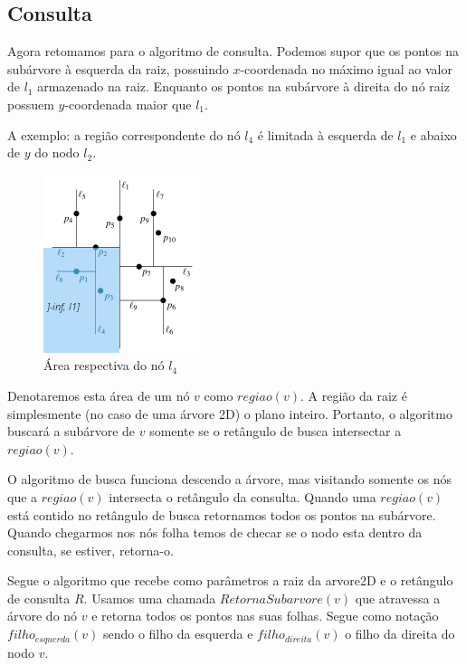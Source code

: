 \subsection{Consulta}

Agora retomamos para o algoritmo de consulta. Podemos supor que os pontos na subárvore à esquerda
da raiz, possuindo $x$-coordenada no máximo igual ao valor de $l_1$ armazenado na raiz.
Enquanto os pontos na subárvore à direita do nó raiz possuem $y$-coordenada maior que $l_1$.

A exemplo: a região correspondente do nó \(l_4\) é limitada à esquerda de
\(l_1\) e abaixo de \(y\) do nodo \(l_2\).


\begin{figure}[htb]
    \caption{\label{fig:Fig_4} Área respectiva do nó $l_4$}
    \begin{center}
        \includegraphics{images/kd_tree2.png}
    \end{center}
\end{figure}

Denotaremos esta área de um nó \(v\) como \(regiao(v)\). A região da raiz é simplesmente
(no caso de uma árvore 2D) o plano inteiro.
Portanto, o algoritmo buscará a subárvore de \(v\) somente se o retângulo de busca intersectar
a \(regiao(v)\).

O algoritmo de busca funciona descendo a árvore, mas visitando somente os nós que a
\(regiao(v)\) intersecta o retângulo da consulta. Quando uma \(regiao(v)\) está contido no
retângulo de busca retornamos todos os pontos na subárvore.
Quando chegarmos nos nós folha temos de checar se o nodo esta dentro da consulta, se estiver,
retorna-o.

Segue o algoritmo que recebe como parâmetros a raiz da arvore2D e o retângulo de consulta \(R\).
Usamos uma chamada \(RetornaSubarvore(v)\) que atravessa a árvore do nó \(v\) e retorna
todos os pontos nas suas folhas. Segue como notação \(filho_{esquerda}(v)\) sendo o filho da esquerda e
\(filho_{direita}(v)\) o filho da direita do nodo \(v\).


